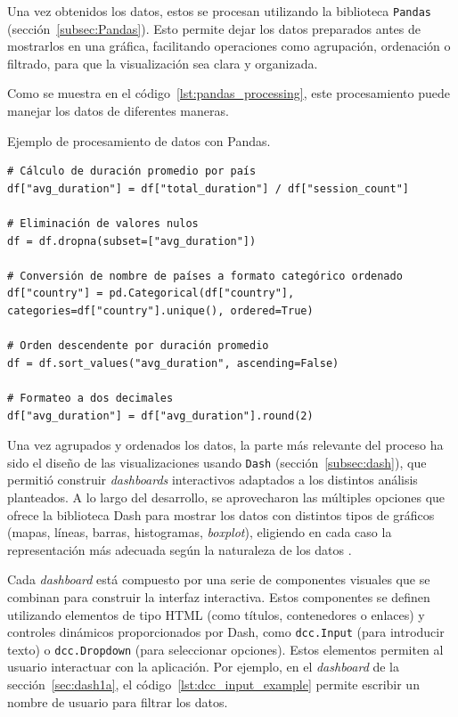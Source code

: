 \documentclass[a4paper, 12pt]{book}
\begin{document}
Una vez obtenidos los datos, estos se procesan utilizando la biblioteca \texttt{Pandas} (sección~\ref{subsec:Pandas}). Esto permite dejar los datos preparados antes de mostrarlos en una gráfica, facilitando operaciones como agrupación, ordenación o filtrado, para que la visualización sea clara y organizada.

Como se muestra en el código~\ref{lst:pandas_processing}, este procesamiento puede manejar los datos de diferentes maneras.

\begin{listing}[h!]
\caption{Ejemplo de procesamiento de datos con Pandas.}
\label{lst:pandas_processing}
\begin{verbatim}
# Cálculo de duración promedio por país
df["avg_duration"] = df["total_duration"] / df["session_count"]

# Eliminación de valores nulos
df = df.dropna(subset=["avg_duration"])

# Conversión de nombre de países a formato categórico ordenado
df["country"] = pd.Categorical(df["country"], categories=df["country"].unique(), ordered=True)

# Orden descendente por duración promedio
df = df.sort_values("avg_duration", ascending=False)

# Formateo a dos decimales 
df["avg_duration"] = df["avg_duration"].round(2)
\end{verbatim}
\end{listing}

Una vez agrupados y ordenados los datos, la parte más relevante del proceso ha sido el diseño de las visualizaciones usando \texttt{Dash} (sección~\ref{subsec:dash}), que permitió construir \textit{dashboards} interactivos adaptados a los distintos análisis planteados. A lo largo del desarrollo, se aprovecharon las múltiples opciones que ofrece la biblioteca Dash para mostrar los datos con distintos tipos de gráficos (mapas, líneas, barras, histogramas, \textit{boxplot}), eligiendo en cada caso la representación más adecuada según la naturaleza de los datos \cite{rGraphGallery}.

Cada \textit{dashboard} está compuesto por una serie de componentes visuales que se combinan para construir la interfaz interactiva. Estos componentes se definen utilizando elementos de tipo HTML (como títulos, contenedores o enlaces) y controles dinámicos proporcionados por Dash, como \texttt{dcc.Input} (para introducir texto) o \texttt{dcc.Dropdown} (para seleccionar opciones). Estos elementos permiten al usuario interactuar con la aplicación. Por ejemplo, en el \textit{dashboard} de la sección~\ref{sec:dash1a}, el código~\ref{lst:dcc_input_example} permite escribir un nombre de usuario para filtrar los datos.
\end{document}
